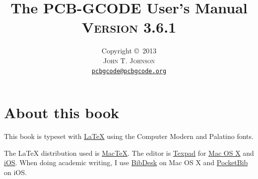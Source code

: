 \documentclass[11pt]{book}
\title{\vspace{-15mm}\fontsize{24pt}{10pt}\selectfont\textbf{The PCB-GCODE User's Manual}\\[1em]
\fontsize{18pt}{10pt}\textsc{Version 3.6.1}\\[1em]
}
\author{
\large
Copyright \copyright\ 2013\\[1em]
\textsc{John T. Johnson}\\[2mm] %
\normalsize \href{mailto:pcbgcode@pcbgcode.org}{\texttt{pcbgcode@pcbgcode.org}} %
\vspace{-5mm}
}
\begin{document}


\newcommand{\warning}[1]{
	\marginpar{
		\vspace{0.1in}
		\texttt{[image: /Users/john/Dropbox/Docs/warning.pdf]}
		\centering
		#1
	}
}

\newcommand{\information}[1]{
	\marginpar{
		\vspace{0.1in}
		\texttt{[image: /Users/john/Dropbox/Docs/information.pdf]}
		\centering
		#1
	}
}

\newcommand{\howitworks}[1]{
	\marginpar{
		\vspace{0.1in}
		\texttt{[image: /Users/john/Dropbox/Docs/gears.pdf]}
		\centering
		#1
	}
}


  
\setlength{\marginparwidth}{1.0in}
\setlength{\marginparsep}{1em}


\newcommand{\code}[1]{\texttt{#1}}



\frontmatter

\maketitle

%
%
\section*{About this book}

This book is typeset with \href{http://en.wikipedia.org/wiki/LaTeX}{\LaTeX{}} using the Computer Modern and Palatino fonts.
\vspace{1ex}

\noindent The \LaTeX{} distribution used is \href{http://tug.org/mactex/}{MacTeX}. The editor is \href{http://texpadapp.com}{Texpad} for \href{http://www.apple.com/osx/}{Mac OS X} and \href{http://www.apple.com/ios/}{iOS}. When doing academic writing, I use \href{http://bibdesk.sourceforge.net}{BibDesk} on Mac OS X and \href{https://itunes.apple.com/us/app/pocketbib-for-bibtex-bibdesk/id524521749?mt=8}{PocketBib} on iOS.
\vspace{1ex}
\end{document}

